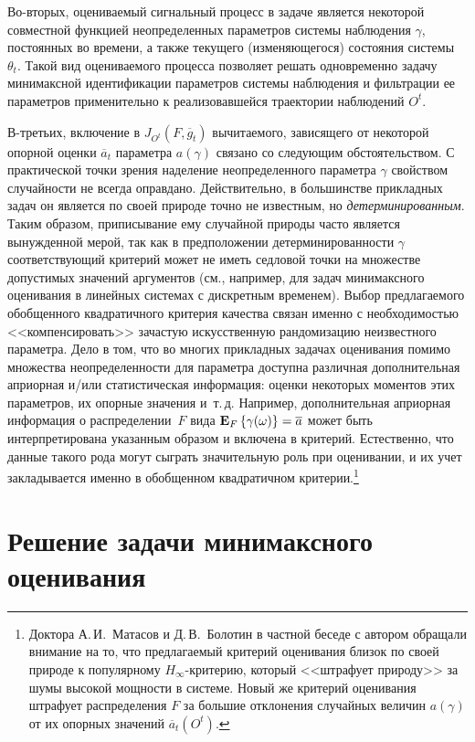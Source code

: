 \begin{multicols}{2}
Во-вторых, оцениваемый сигнальный процесс в задаче является
некоторой совместной функцией неопределенных параметров системы
наблюдения $\gamma$, постоянных во времени, а также текущего
(изменяющегося) состояния системы $\theta_t$. Такой вид оцениваемого
процесса позволяет решать одновременно задачу минимаксной
идентификации параметров системы наблюдения и фильтрации ее параметров
применительно к реализовавшейся траектории наблюдений $O^t$.

В-третьих, включение в $J_{O^t}(F,\overline{g}_t)$ вычитаемого,
зависящего от некоторой опорной оценки $\overline{a}_t$ параметра
$a(\gamma)$ связано со следующим обстоятельством.
 С практической точки зрения наделение не\-опре\-де\-лен\-но\-го параметра
 $\gamma$ свойством слу\-чай\-но\-сти не всегда оправдано.
 Действительно, в большинстве прикладных задач он является по своей природе точно не известным,
 но \emph{детерминированным}. Таким образом, приписывание ему случайной природы часто
 является вынужденной мерой, так как в предположении
 детерминированности $\gamma$ соот\-вет\-ст\-ву\-ющий
 критерий может не иметь седловой точки на множестве допустимых значений аргументов (см., например, \cite{m_m}
 для задач ми\-ни\-макс\-но\-го оценивания в линейных системах с дискретным
 временем). Выбор предлагаемого обобщенного квадратичного критерия качества связан именно с
 необ\-хо\-ди\-мостью <<компенсировать>> за\-час\-тую искусственную
 рандомизацию неизвестного па\-ра\-мет\-ра. Дело в том, что во многих
 прикладных задачах оценивания помимо множества неопределенности для
 параметра доступна различная дополнительная априорная и/или
 статистическая информация: оценки некоторых моментов этих
 параметров, их опорные значения и~т.\,д.
 Например, дополнительная априорная информация о распределении~$F$ вида
 $\mathbf{E}_{ F }\left\{ \mathop{\gamma(\omega)} \right\}=\overline{a}$ может быть интерпретирована
 указанным образом и включена в критерий. Естественно, что данные такого рода могут сыграть
 значительную роль при оценивании, и их учет закладывается именно в обобщенном квад\-ра\-тич\-ном
 критерии.\footnote{Доктора А.\,И.~Матасов и Д.\,В.~Болотин в частной беседе с автором обращали внимание
 на то, что предлагаемый критерий оценивания близок по своей природе к популярному
 $H_{\infty}$-критерию, который <<штрафует природу>> за шумы высокой мощности в системе. Новый же критерий оценивания
штрафует распределения $F$ за большие отклонения случайных
 величин $a(\gamma)$ от их опорных значений
 $\overline{a}_t(O^t)$.}


 \section{Решение задачи минимаксного оценивания} %


\end{multicols}
